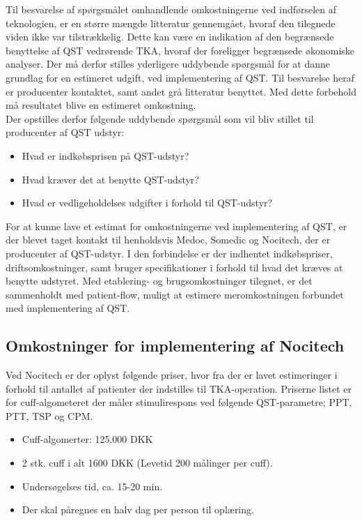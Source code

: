 Til besvarelse af spørgsmålet omhandlende omkostningerne ved indførselen af teknologien, er en større mængde litteratur gennemgået, hvoraf den tilegnede viden ikke var tilstrækkelig. Dette kan være en indikation af den begrænsede benyttelse af QST vedrørende TKA, hvoraf der foreligger begrænsede økonomiske analyser. Der må derfor stilles yderligere uddybende spørgsmål for at danne grundlag for en estimeret udgift, ved implementering af QST. Til besvarelse heraf er producenter kontaktet, samt andet grå litteratur benyttet. Med dette forbehold må resultatet blive en estimeret omkostning. \\
Der opstilles derfor følgende uddybende spørgsmål som vil bliv stillet til producenter af QST udstyr:
\begin{itemize}  
\item Hvad er indkøbsprisen på QST-udstyr? 
\item Hvad kræver det at benytte QST-udstyr? 
\item Hvad er vedligeholdelses udgifter i forhold til QST-udstyr?
\end{itemize}
For at kunne lave et estimat for omkostningerne ved implementering af QST, er der blevet taget kontakt til 
henholdsvis Medoc, Somedic og Nocitech, der er producenter af QST-udstyr. I den forbindelse er der indhentet indkøbspriser, driftsomkostninger, samt bruger specifikationer i forhold til hvad det kræves at benytte udstyret. Med etablering- og brugsomkostninger tilegnet, er det sammenholdt med patient-flow, muligt at estimere meromkostningen forbundet med implementering af QST. 

\subsection{Omkostninger for implementering af Nocitech}\label{priser}
Ved Nocitech er der oplyst følgende priser, hvor fra der er lavet estimeringer i forhold til antallet af patienter der indstilles til TKA-operation. Priserne listet er for cuff-algometeret der måler stimulirespons ved følgende QST-parametre; PPT, PTT, TSP og CPM.

\begin{itemize}  
\item Cuff-algomerter: 125.000 DKK
\item 2 stk. cuff i  alt 1600 DKK (Levetid 200 målinger per cuff).
\item Undersøgelses tid, ca. 15-20 min.
\item Der skal påregnes en halv dag per person til oplæring.
\end{itemize}

